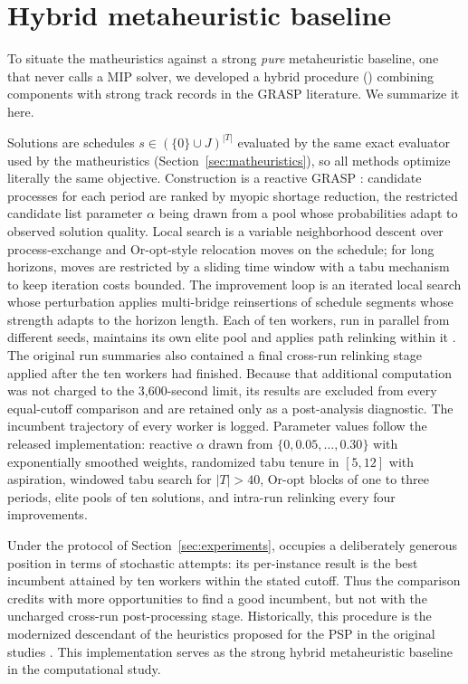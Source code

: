 \section{Hybrid metaheuristic baseline}
\label{sec:metaheuristic}

To situate the matheuristics against a strong \emph{pure}
metaheuristic baseline, one that never calls a MIP solver, we developed
a hybrid procedure (\ILS) combining components with strong track
records in the GRASP literature. We summarize it here.

Solutions are schedules $s\in(\{0\}\cup J)^{|T|}$ evaluated by the
same exact evaluator used by the matheuristics
(Section~\ref{sec:matheuristics}), so all methods optimize literally
the same objective. Construction is a reactive GRASP
\citep{feo1995greedy,prais2000reactive}: candidate processes for each
period are ranked by myopic shortage reduction, the restricted
candidate list parameter $\alpha$ being drawn from a pool whose
probabilities adapt to observed solution quality. Local search is a
variable neighborhood descent over process-exchange and Or-opt-style
relocation moves on the schedule; for long horizons, moves are
restricted by a sliding time window with a tabu mechanism to keep
iteration costs bounded. The improvement loop is an iterated local
search \citep{lourenco2010iterated} whose perturbation applies
multi-bridge reinsertions of schedule segments whose strength adapts
to the horizon length. Each of ten workers, run in parallel from
different seeds, maintains its own elite pool and applies path
relinking within it
\citep{laguna1999grasp,resende2016optimization}. The original run
summaries also contained a final cross-run relinking stage applied
after the ten workers had finished. Because that additional computation
was not charged to the 3,600-second limit, its results are excluded
from every equal-cutoff comparison and are retained only as a
post-analysis diagnostic. The incumbent trajectory of every worker is
logged.
Parameter values follow the released implementation: reactive
$\alpha$ drawn from $\{0, 0.05, \ldots, 0.30\}$ with exponentially
smoothed weights, randomized tabu tenure in $[5,12]$ with aspiration,
windowed tabu search for $|T|>40$, Or-opt blocks of one to three
periods, elite pools of ten solutions, and intra-run relinking every
four improvements.

Under the protocol of Section~\ref{sec:experiments}, \ILS{} occupies a
deliberately generous position in terms of stochastic attempts: its
per-instance result is the best incumbent attained by ten workers
within the stated cutoff. Thus the comparison credits \ILS{} with more
opportunities to find a good incumbent, but not with the uncharged
cross-run post-processing stage. Historically, this procedure is the
modernized descendant of the heuristics proposed for the PSP in the
original studies \citep{luche2009combining}. This implementation serves
as the strong hybrid metaheuristic baseline in the computational study.
